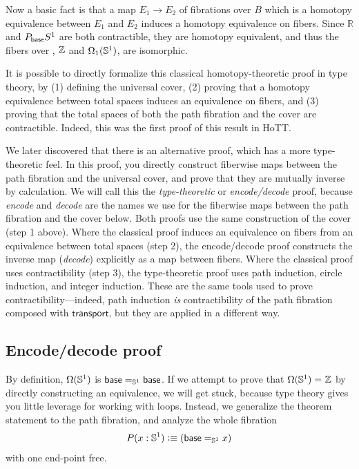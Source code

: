 Now a basic fact is that a map $E_1\to E_2$ of fibrations over $B$
which is a homotopy equivalence between $E_1$ and $E_2$ induces a
homotopy equivalence on fibers.  Since $\mathbb{R}$ and $P_{\base} S^1$
are both contractible, they are homotopy equivalent, and thus the fibers
over \base, $\Z$ and $\Omega_1(\Sn ^1)$, are isomorphic.

\smallskip

It is possible to directly formalize this classical homotopy-theoretic
proof in type theory, by (1) defining the universal cover, (2) proving
that a homotopy equivalence between total spaces induces an equivalence
on fibers, and (3) proving that the total spaces of both the path
fibration and the cover are contractible. Indeed, this was the first
proof of this result in HoTT.

We later discovered that there is an alternative proof, which has a more
type-theoretic feel.  In this proof, you directly construct fiberwise
maps between the path fibration and the universal cover, and prove that
they are mutually inverse by calculation.  We will call this the
\emph{type-theoretic} or \emph{encode/decode} proof, because
\emph{encode} and \emph{decode} are the names we use for the fiberwise
maps between the path fibration and the cover below.  Both proofs use
the same construction of the cover (step 1 above).  Where the classical
proof induces an equivalence on fibers from an equivalence between total
spaces (step 2), the encode/decode proof constructs the inverse map
(\emph{decode}) explicitly as a map between fibers.  Where the classical
proof uses contractibility (step 3), the type-theoretic proof uses path
induction, circle induction, and integer induction.  These are the same
tools used to prove contractibility---indeed, path induction \emph{is}
contractibility of the path fibration composed with
$\mathsf{transport}$, but they are applied in a different way.

\subsection{Encode/decode proof}

By definition, $\Omega(\Sn ^1)$ is $\id[\Sn ^1] \base \base$.  If we
attempt to prove that $\id {\Omega(\Sn ^1)} {\Z}$ by directly
constructing an equivalence, we will get stuck, because type theory
gives you little leverage for working with loops.  Instead, we
generalize the theorem statement to the path fibration, and analyze the
whole fibration
\[
P(x:\Sn ^1) \defeq (\id[\Sn ^1] \base x)
\]
with one end-point free.  

